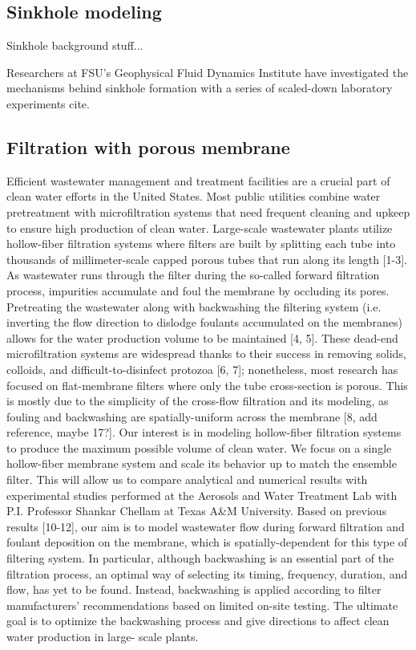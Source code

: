 \documentclass[12pt]{article}
\newcommand{\np}{\newpage \noindent}
\begin{document}
\subsection{Sinkhole modeling}

Sinkhole background stuff...

Researchers at FSU's Geophysical Fluid Dynamics Institute have investigated the mechanisms behind sinkhole formation with a series of scaled-down laboratory experiments {\color{blue} cite}.

\np
\subsection{Filtration with porous membrane}


Efficient wastewater management and treatment facilities are a crucial part of clean water efforts in the United States. Most public utilities combine water pretreatment with microfiltration systems that need frequent cleaning and upkeep to ensure high production of clean water. Large-scale wastewater plants utilize hollow-fiber filtration systems where filters are built by splitting each tube into thousands of millimeter-scale capped porous tubes that run along its length [1-3]. As wastewater runs through the filter during the so-called forward filtration process, impurities accumulate and foul the membrane by occluding its pores. Pretreating the wastewater along with backwashing the filtering system (i.e. inverting the flow direction to dislodge foulants accumulated on the membranes) allows for the water production volume to be maintained [4, 5]. These dead-end microfiltration systems are widespread thanks to their success in removing solids, colloids, and difficult-to-disinfect protozoa [6, 7]; nonetheless, most research has focused on flat-membrane filters where only the tube cross-section is porous. This is mostly due to the simplicity of the cross-flow filtration and its modeling, as fouling and backwashing are spatially-uniform across the membrane [8, add reference, maybe 17?].
Our interest is in modeling hollow-fiber filtration systems to produce the maximum possible volume of clean water. We focus on a single hollow-fiber membrane system and scale its behavior up to match the ensemble filter. This will allow us to compare analytical and numerical results with experimental studies performed at the Aerosols and Water Treatment Lab with P.I. Professor Shankar Chellam at Texas A\&M University. Based on previous results [10-12], our aim is to model wastewater flow during forward filtration and foulant deposition on the membrane, which is spatially-dependent for this type of filtering system. In particular, although backwashing is an essential part of the filtration process, an optimal way of selecting its timing, frequency, duration, and flow, has yet to be found. Instead, backwashing is applied according to filter manufacturers’ recommendations based on limited on-site testing. The ultimate goal is to optimize the backwashing process and give directions to affect clean water production in large- scale plants.
\end{document}

